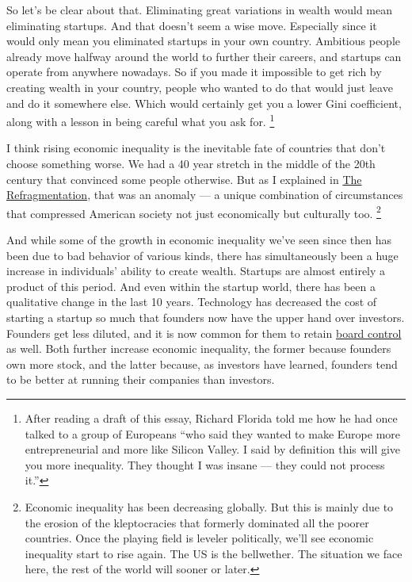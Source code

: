 So let's be clear about that. Eliminating great variations in wealth
would mean eliminating startups. And that doesn't seem a wise move.
Especially since it would only mean you eliminated startups in your own
country. Ambitious people already move halfway around the world to
further their careers, and startups can operate from anywhere nowadays.
So if you made it impossible to get rich by creating wealth in your
country, people who wanted to do that would just leave and do it
somewhere else. Which would certainly get you a lower Gini coefficient,
along with a lesson in being careful what you ask for.
\footnote{After reading a draft of this essay, Richard Florida told me how
he had once talked to a group of Europeans ``who said they wanted to
make Europe more entrepreneurial and more like Silicon Valley. I said by
definition this will give you more inequality. They thought I was insane
--- they could not process it.''}

I think rising economic inequality is the inevitable fate of countries
that don't choose something worse. We had a 40 year stretch in the
middle of the 20th century that convinced some people otherwise. But as
I explained in \href{re.html}{The Refragmentation}, that was an anomaly
--- a unique combination of circumstances that compressed American
society not just economically but culturally too.
\footnote{Economic inequality has been decreasing globally. But this is
mainly due to the erosion of the kleptocracies that formerly dominated
all the poorer countries. Once the playing field is leveler politically,
we'll see economic inequality start to rise again. The US is the
bellwether. The situation we face here, the rest of the world will
sooner or later.}

And while some of the growth in economic inequality we've seen since
then has been due to bad behavior of various kinds, there has
simultaneously been a huge increase in individuals' ability to create
wealth. Startups are almost entirely a product of this period. And even
within the startup world, there has been a qualitative change in the
last 10 years. Technology has decreased the cost of starting a startup
so much that founders now have the upper hand over investors. Founders
get less diluted, and it is now common for them to retain
\href{control.html}{board control} as well. Both further increase
economic inequality, the former because founders own more stock, and the
latter because, as investors have learned, founders tend to be better at
running their companies than investors.

